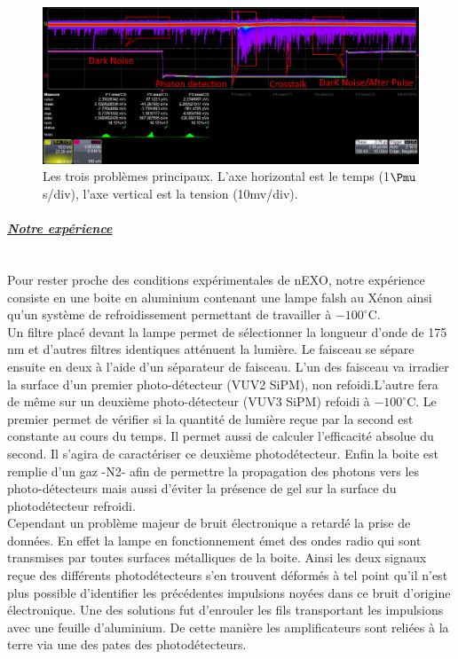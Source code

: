 \documentclass[a4paper, 11pt]{report}%
\begin{document}
  \begin{figure}[!hbtp]
  \centering
    \includegraphics[totalheight=0.2\textwidth,trim=0.3cm 6.6cm 0.1cm 0cm, clip=true]{../Pictures/Pictures_oscilloscope/DN_AP_CT_1.jpg}
    \caption{Les trois probl\`emes principaux. L'axe horizontal est le temps (1$\Pmu$s/div), l'axe vertical est la tension (10mv/div).}
    \label{fig:DN_AP_CT}
  \end{figure}
  
\paragraph{\textit{\underline{Notre exp\'erience}}}
  \leavevmode
  \\
  
  Pour rester proche des conditions exp\'erimentales de nEXO, notre exp\'erience consiste en une boite en aluminium contenant une 
  lampe falsh au X\'enon ainsi qu'un syst\`eme de refroidissement permettant de travailler \`a $-100^\circ$C.\\
  Un filtre plac\'e devant la lampe permet de s\'electionner la longueur d'onde de 175 nm et d'autres filtres identiques att\'enuent la lumi\`ere. 
  Le faisceau se s\'epare ensuite en deux \`a l'aide d'un s\'eparateur de faisceau. L'un des faisceau va irradier la surface d'un premier photo-d\'etecteur 
  (VUV2 SiPM), non refoidi.L'autre fera de m\^eme sur un deuxi\`eme photo-d\'etecteur (VUV3 SiPM) refoidi \`a $-100^\circ$C. 
  Le premier permet de v\'erifier si la quantit\'e de lumi\`ere re\c cue par la second est constante au cours du temps. Il permet aussi de 
  calculer l'efficacit\'e absolue du second. Il s'agira de caract\'eriser ce deuxi\`eme photod\'etecteur. Enfin la boite est remplie 
  d'un gaz -N2- afin de permettre la propagation des photons vers 
  les photo-d\'etecteurs mais aussi d'\'eviter la pr\'esence de gel sur la surface du photod\'etecteur refroidi. 
  \\
  
  Cependant un probl\`eme majeur de bruit \'electronique a retard\'e la prise de donn\'ees. En effet la lampe en fonctionnement \'emet des ondes 
  radio qui sont transmises par toutes surfaces m\'etalliques de la boite. Ainsi les deux signaux re\c cue des diff\'erents photod\'etecteurs 
  s'en trouvent d\'eform\'es \`a tel point qu'il n'est plus possible d'identifier les pr\'ec\'edentes impulsions noy\'ees dans ce bruit d'origine 
  \'electronique. Une des solutions fut d'enrouler les fils transportant les impulsions avec une feuille d'aluminium. De cette 
  mani\`ere les amplificateurs sont reli\'ees \`a la terre via une des pates des photod\'etecteurs.
  
\end{document}
